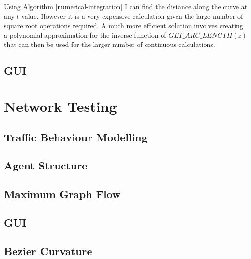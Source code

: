     Using Algorithm \ref{numerical-integration} I can find the distance along the curve at any $t$-value. However it is a very expensive calculation given the large number of square root operations required. A much more efficient solution involves creating a polynomial approximation for the inverse function of $GET\_ARC\_LENGTH(z)$ that can then be used for the larger number of continuous calculations.

    \subsection{GUI}

\section{Network Testing}

    \subsection{Traffic Behaviour Modelling}

    \subsection{Agent Structure}

    \subsection{Maximum Graph Flow}

    \subsection{GUI}

    \subsection{Bezier Curvature}
